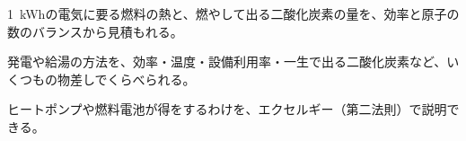\begin{furikaeri}
\begin{checklist}
\item \qty{1}{kWh}の電気に要る燃料の熱と、燃やして出る二酸化炭素の量を、効率と原子の数のバランスから見積もれる。
\item 発電や給湯の方法を、効率・温度・設備利用率・一生で出る二酸化炭素など、いくつもの物差しでくらべられる。
\item ヒートポンプや燃料電池が得をするわけを、エクセルギー（第二法則）で説明できる。
\end{checklist}
\end{furikaeri}
